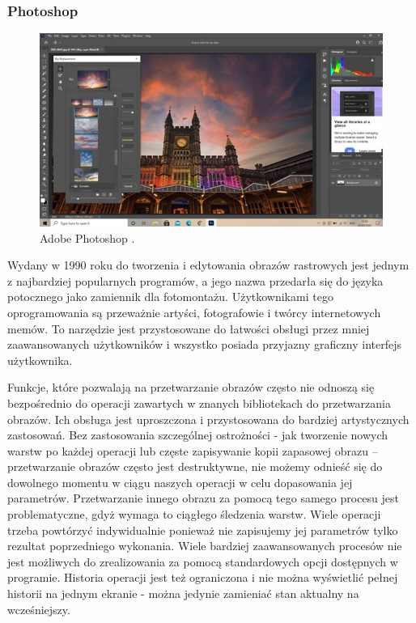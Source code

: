 \subsubsection{Photoshop}
\begin{figure}[H]
    \centering
    \includegraphics{./images/Picture2.jpg}
    \caption{Adobe Photoshop \cite{photoshop}.}
    \label{fig:photoshop}
\end{figure}

Wydany w 1990 roku do tworzenia i edytowania obrazów rastrowych jest jednym z najbardziej popularnych programów, a jego nazwa przedarła się do języka potocznego jako zamiennik dla fotomontażu. 
Użytkownikami tego oprogramowania są przeważnie artyści, fotografowie i twórcy internetowych memów. 
To narzędzie jest przystosowane do łatwości obsługi przez mniej zaawansowanych użytkowników i wszystko posiada przyjazny graficzny interfejs użytkownika. 

Funkcje, które pozwalają na przetwarzanie obrazów często nie odnoszą się bezpośrednio do operacji zawartych w znanych bibliotekach do przetwarzania obrazów. 
Ich obsługa jest uproszczona i przystosowana do bardziej artystycznych zastosowań. 
Bez zastosowania szczególnej ostrożności - jak tworzenie nowych warstw po każdej operacji lub częste zapisywanie kopii zapasowej obrazu – przetwarzanie obrazów często jest destruktywne, nie możemy odnieść się do dowolnego momentu w ciągu naszych operacji w celu dopasowania jej parametrów. 
Przetwarzanie innego obrazu za pomocą tego samego procesu jest problematyczne, gdyż wymaga to ciągłego śledzenia warstw. Wiele operacji trzeba powtórzyć indywidualnie ponieważ nie zapisujemy jej parametrów tylko rezultat poprzedniego wykonania. Wiele bardziej zaawansowanych procesów nie jest możliwych do zrealizowania za pomocą standardowych opcji dostępnych w programie. Historia operacji jest też ograniczona i nie można wyświetlić pełnej historii na jednym ekranie - można jedynie zamieniać stan aktualny na wcześniejszy.

